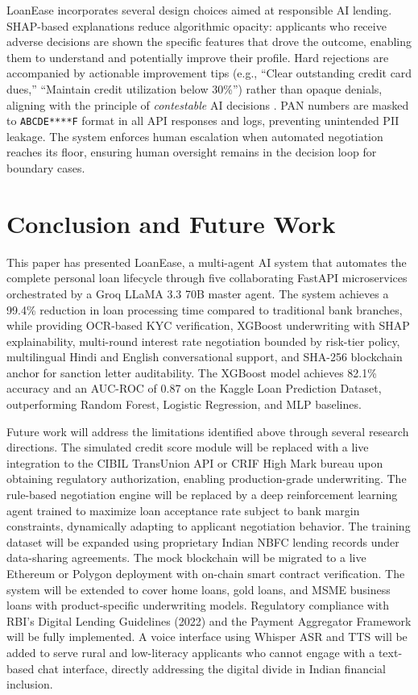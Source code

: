 \documentclass[conference]{IEEEtran}
\begin{document}
LoanEase incorporates several design choices aimed at
responsible AI lending. SHAP-based explanations reduce
algorithmic opacity: applicants who receive adverse
decisions are shown the specific features that drove
the outcome, enabling them to understand and
potentially improve their profile. Hard rejections
are accompanied by actionable improvement tips (e.g.,
``Clear outstanding credit card dues,'' ``Maintain
credit utilization below 30\%'') rather than
opaque denials, aligning with the principle of
\textit{contestable} AI decisions \cite{zheng2024blockchain}.
PAN numbers are masked to \texttt{ABCDE****F} format
in all API responses and logs, preventing unintended
PII leakage. The system enforces human escalation
when automated negotiation reaches its floor, ensuring
human oversight remains in the decision loop for
boundary cases.

\section{Conclusion and Future Work}

This paper has presented LoanEase, a multi-agent AI
system that automates the complete personal loan
lifecycle through five collaborating FastAPI
microservices orchestrated by a Groq LLaMA 3.3 70B
master agent. The system achieves a 99.4\% reduction
in loan processing time compared to traditional
bank branches, while providing OCR-based KYC
verification, XGBoost underwriting with SHAP
explainability, multi-round interest rate negotiation
bounded by risk-tier policy, multilingual Hindi and
English conversational support, and SHA-256 blockchain
anchor for sanction letter auditability. The XGBoost
model achieves 82.1\% accuracy and an AUC-ROC of 0.87
on the Kaggle Loan Prediction Dataset, outperforming
Random Forest, Logistic Regression, and MLP baselines.

Future work will address the limitations identified
above through several research directions. The
simulated credit score module will be replaced with a
live integration to the CIBIL TransUnion API or CRIF
High Mark bureau upon obtaining regulatory authorization,
enabling production-grade underwriting. The rule-based
negotiation engine will be replaced by a deep
reinforcement learning agent trained to maximize
loan acceptance rate subject to bank margin constraints,
dynamically adapting to applicant negotiation behavior.
The training dataset will be expanded using proprietary
Indian NBFC lending records under data-sharing agreements.
The mock blockchain will be migrated to a live Ethereum
or Polygon deployment with on-chain smart contract
verification. The system will be extended to cover home
loans, gold loans, and MSME business loans with
product-specific underwriting models. Regulatory
compliance with RBI's Digital Lending Guidelines (2022)
and the Payment Aggregator Framework will be fully
implemented. A voice interface using Whisper ASR and
TTS will be added to serve rural and low-literacy
applicants who cannot engage with a text-based chat
interface, directly addressing the digital divide in
Indian financial inclusion.
\end{document}
